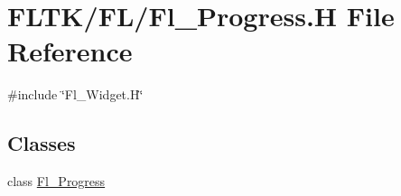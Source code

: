 \hypertarget{_fl___progress_8_h}{}\section{F\+L\+T\+K/\+F\+L/\+Fl\+\_\+\+Progress.H File Reference}
\label{_fl___progress_8_h}
{\ttfamily \#include \char`\"{}Fl\+\_\+\+Widget.\+H\char`\"{}}\newline
\subsection*{Classes}
\begin{DoxyCompactItemize}
\item 
class \hyperlink{class_fl___progress}{Fl\+\_\+\+Progress}
\end{DoxyCompactItemize}
